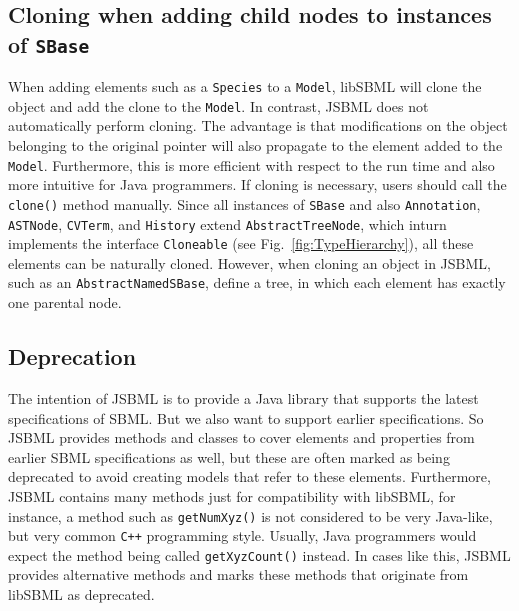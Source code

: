 \subsection{Cloning when adding child nodes to instances of \texttt{SBase}}

When adding elements such as a \texttt{Species}
%
to a \texttt{Model}, libSBML will
clone the object and add the clone to the \texttt{Model}. In contrast,
JSBML does
not automatically perform cloning. The advantage is that modifications on the
object belonging to the original pointer will also propagate to the element
added to the \texttt{Model}. Furthermore, this is more efficient with respect to
the run time and also more intuitive for Java programmers. If cloning is
necessary, users should call the \texttt{clone()} method manually. Since all
instances of \texttt{SBase} and also
\texttt{Annotation},
\texttt{ASTNode},
\texttt{CVTerm}, and
\texttt{History} extend
\texttt{AbstractTreeNode},
which inturn implements the interface \texttt{Cloneable} (see
Fig.~\vref{fig:TypeHierarchy}), all these elements can be naturally cloned.
However, when cloning an object in JSBML, such as an
\texttt{AbstractNamedSBase},
define a tree, in which each element has exactly one parental node.

\subsection{Deprecation}

The intention of JSBML is to provide a Java library
that supports the latest specifications of SBML.
%
%
But we also want to support earlier specifications. So JSBML provides methods
and classes to cover elements and properties from earlier SBML specifications as
well, but these are often marked as being deprecated to avoid creating models
that refer to these elements. Furthermore, JSBML contains many methods just for
compatibility with libSBML, for instance, a method such as \texttt{getNumXyz()}
is not considered to be very Java-like, but very common
\texttt{C++} programming style. Usually, Java
programmers would expect the method being called \texttt{getXyzCount()}
instead. In cases like this, JSBML provides alternative methods and marks these
methods that originate from libSBML as deprecated.


